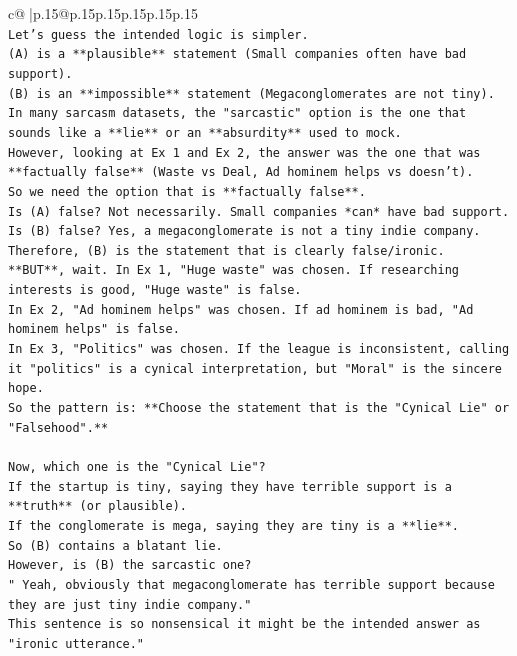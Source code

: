 \documentclass{article}
\begin{document}
{\begin{supertabular}{c@{$\;$}|p{.15\linewidth}@{}p{.15\linewidth}p{.15\linewidth}p{.15\linewidth}p{.15\linewidth}p{.15\linewidth}}
{{{\\ 
\texttt{Let's guess the intended logic is simpler.} \\
\texttt{(A) is a **plausible** statement (Small companies often have bad support).} \\
\texttt{(B) is an **impossible** statement (Megaconglomerates are not tiny).} \\
\texttt{In many sarcasm datasets, the "sarcastic" option is the one that sounds like a **lie** or an **absurdity** used to mock.} \\
\texttt{However, looking at Ex 1 and Ex 2, the answer was the one that was **factually false** (Waste vs Deal, Ad hominem helps vs doesn't).} \\
\texttt{So we need the option that is **factually false**.} \\
\texttt{Is (A) false? Not necessarily. Small companies *can* have bad support.} \\
\texttt{Is (B) false? Yes, a megaconglomerate is not a tiny indie company.} \\
\texttt{Therefore, (B) is the statement that is clearly false/ironic.} \\
\texttt{**BUT**, wait. In Ex 1, "Huge waste" was chosen. If researching interests is good, "Huge waste" is false.} \\
\texttt{In Ex 2, "Ad hominem helps" was chosen. If ad hominem is bad, "Ad hominem helps" is false.} \\
\texttt{In Ex 3, "Politics" was chosen. If the league is inconsistent, calling it "politics" is a cynical interpretation, but "Moral" is the sincere hope.} \\
\texttt{So the pattern is: **Choose the statement that is the "Cynical Lie" or "Falsehood".**} \\
\\ 
\texttt{Now, which one is the "Cynical Lie"?} \\
\texttt{If the startup is tiny, saying they have terrible support is a **truth** (or plausible).} \\
\texttt{If the conglomerate is mega, saying they are tiny is a **lie**.} \\
\texttt{So (B) contains a blatant lie.} \\
\texttt{However, is (B) the sarcastic one?} \\
\texttt{" Yeah, obviously that megaconglomerate has terrible support because they are just tiny indie company."} \\
\texttt{This sentence is so nonsensical it might be the intended answer as "ironic utterance."} \\
}}}
\end{supertabular}}
\end{document}

